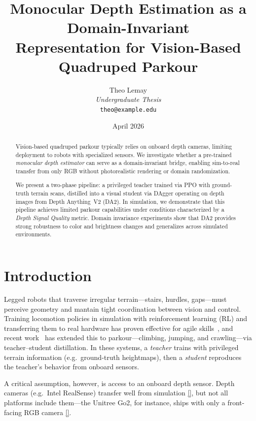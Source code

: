 \documentclass[10pt,twocolumn]{article}
\title{%
  Monocular Depth Estimation as a Domain-Invariant\\
  Representation for Vision-Based Quadruped Parkour
}
\author{
  Theo Lemay \\
  \textit{Undergraduate Thesis} \\
  \texttt{theo@example.edu}
}
\date{April 2026}
\begin{document}
\maketitle

\begin{abstract}
  Vision-based quadruped parkour typically relies on onboard depth cameras, limiting deployment to robots with specialized sensors. We investigate whether a pre-trained \emph{monocular depth estimator} can serve as a domain-invariant bridge, enabling sim-to-real transfer from only RGB without photorealistic rendering or domain randomization.

  We present a two-phase pipeline: a privileged teacher trained via PPO with ground-truth terrain scans, distilled into a visual student via DAgger operating on depth images from Depth Anything~V2 (DA2).
  In simulation, we demonstrate that this pipeline achieves limited parkour capabilities under conditions characterized by a \emph{Depth Signal Quality} metric.
  Domain invariance experiments show that DA2 provides strong robustness to color and brightness changes and generalizes across simulated environments.
\end{abstract}

\section{Introduction}
\label{sec:intro}

Legged robots that traverse irregular terrain---stairs, hurdles, gaps---must perceive geometry and mantain tight coordination between vision and control.
Training locomotion policies in simulation with reinforcement learning (RL) and transferring them to real hardware has proven effective for agile skills~\citep{lee2020learning, bellegarda2020robust, fu2021minimizing,margolis2021learning, rudin2022learning, bellegarda2022robust,li2023robust, he2024agile,inoue2024body, ma2024dreureka}, and recent work~\citep{caluwaerts2023barkour, zhuang2023robot, cheng2023parkour, hoeller2024anymal, chane2025soloparkour} has extended this to parkour---climbing, jumping, and crawling---via teacher--student distillation.
In these systems, a \emph{teacher} trains with privileged terrain information (e.g.\ ground-truth heightmaps), then a \emph{student} reproduces the teacher's behavior from onboard sensors.

A critical assumption, however, is access to an onboard depth sensor.
Depth cameras (e.g.\ Intel RealSense) transfer well from simulation \ref{}, but not all platforms include them---the Unitree Go2, for instance, ships with only a front-facing RGB camera \ref{}.
\end{document}
